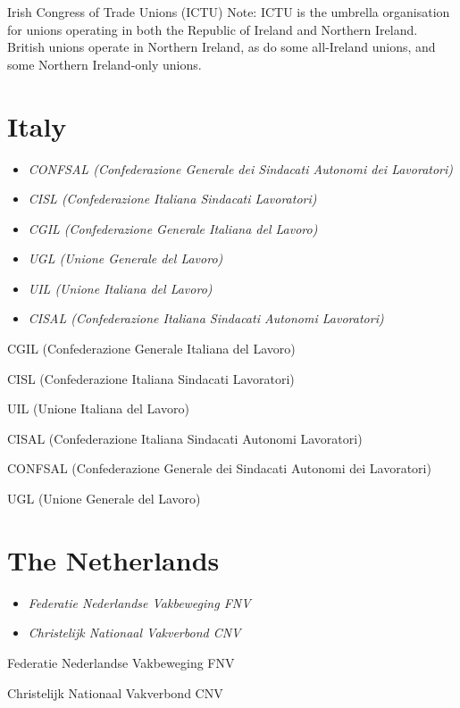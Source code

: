 Irish Congress of Trade Unions (ICTU) Note: ICTU is the umbrella
organisation for unions operating in both the Republic of Ireland and
Northern Ireland. British unions operate in Northern Ireland, as do some
all-Ireland unions, and some Northern Ireland-only unions.

\section{Italy}\label{italy}

\begin{itemize}
\item
  \emph{CONFSAL (Confederazione Generale dei Sindacati Autonomi dei
  Lavoratori)}
\item
  \emph{CISL (Confederazione Italiana Sindacati Lavoratori)}
\item
  \emph{CGIL (Confederazione Generale Italiana del Lavoro)}
\item
  \emph{UGL (Unione Generale del Lavoro)}
\item
  \emph{UIL (Unione Italiana del Lavoro)}
\item
  \emph{CISAL (Confederazione Italiana Sindacati Autonomi Lavoratori)}
\end{itemize}

CGIL (Confederazione Generale Italiana del Lavoro)

CISL (Confederazione Italiana Sindacati Lavoratori)

UIL (Unione Italiana del Lavoro)

CISAL (Confederazione Italiana Sindacati Autonomi Lavoratori)

CONFSAL (Confederazione Generale dei Sindacati Autonomi dei Lavoratori)

UGL (Unione Generale del Lavoro)

\section{The Netherlands}\label{the-netherlands}

\begin{itemize}
\item
  \emph{Federatie Nederlandse Vakbeweging FNV}
\item
  \emph{Christelijk Nationaal Vakverbond CNV}
\end{itemize}

Federatie Nederlandse Vakbeweging FNV

Christelijk Nationaal Vakverbond CNV

